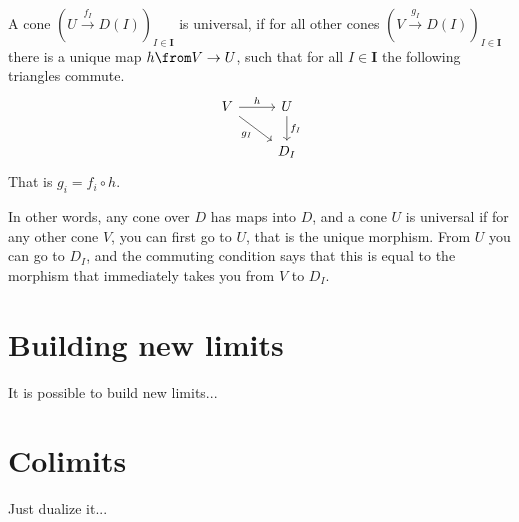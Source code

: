 \begin{definition}
  A cone $(U \overset{f_I}{\to} D(I))_{I\in \bm{I}}$ is universal, if
  for all other cones $(V \overset{g_I}{\to} D(I))_{I\in \bm{I}}$ there is a unique
  map $h \from V \to U$, such that for all $I \in \bm{I}$ the following triangles commute.
  \[
    \begin{tikzcd}
      V \arrow[dr, swap, "g_I"] \arrow{r}{h} & U \arrow{d}{f_I} \\
      & D_I
    \end{tikzcd}
  \]
  That is $g_i = f_i \circ h$.
\end{definition}

In other words, any cone over $D$ has maps into $D$, and a cone $U$ is universal if
for any other cone $V$, you can first go to $U$, that is the unique morphism.
From $U$ you can go to $D_I$, and the commuting condition says that this is equal
to the morphism that immediately takes you from $V$ to $D_I$.


\chapter{Building new limits}
It is possible to build new limits...

\chapter{Colimits}
Just dualize it... 




